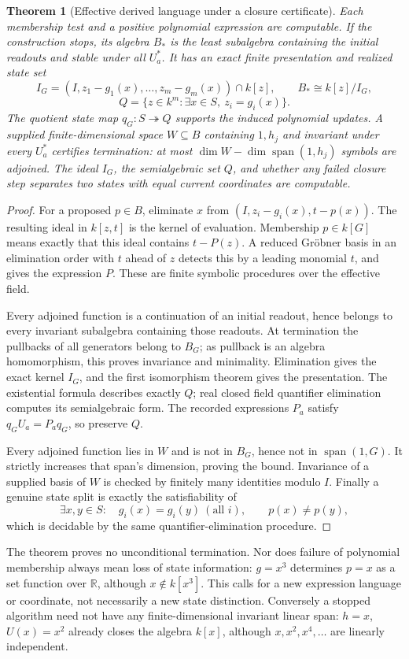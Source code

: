 \documentclass[11pt]{article}
\newtheorem{theorem}{Theorem}[section]
\theoremstyle{definition}
\theoremstyle{remark}\newtheorem{remark}[theorem]{Remark}
\newcommand{\R}{\mathbb R}
\begin{document}
\begin{theorem}[Effective derived language under a closure certificate]
\label{thm:polynomial}
Each membership test and a positive polynomial expression are computable.
If the construction stops, its algebra $B_*$ is the least subalgebra
containing the initial readouts and stable under all $U_a^*$. It has an
exact finite presentation and realized state set
\[
 I_G=(I,z_1-g_1(x),\ldots,z_m-g_m(x))\cap k[z],\qquad
 B_*\cong k[z]/I_G,
\]
\[
 Q=\{z\in k^m:\exists x\in S,\ z_i=g_i(x)\}.
\]
The quotient state map $q_G:S\twoheadrightarrow Q$ supports the induced
polynomial updates. A supplied finite-dimensional space $W\subseteq B$
containing $1,h_j$ and invariant under every $U_a^*$ certifies termination:
at most $\dim W-\dim\operatorname{span}(1,h_j)$ symbols are adjoined.
The ideal $I_G$, the semialgebraic set $Q$, and whether any failed closure
step separates two states with equal current coordinates are computable.
\end{theorem}
\begin{proof}
For a proposed $p\in B$, eliminate $x$ from
$(I,z_i-g_i(x),t-p(x))$. The resulting ideal in $k[z,t]$ is the kernel of
evaluation. Membership $p\in k[G]$ means exactly that this ideal contains
$t-P(z)$. A reduced Gr\"obner basis in an elimination order with $t$ ahead
of $z$ detects this by a leading monomial $t$, and gives the expression
$P$. These are finite symbolic procedures over the effective field.

Every adjoined function is a continuation of an initial readout, hence
belongs to every invariant subalgebra containing those readouts. At
termination the pullbacks of all generators belong to $B_G$; as pullback
is an algebra homomorphism, this proves invariance and minimality.
Elimination gives the exact kernel $I_G$, and the first isomorphism theorem
gives the presentation. The existential formula describes exactly $Q$;
real closed field quantifier elimination computes its semialgebraic form.
The recorded expressions $P_a$ satisfy $q_GU_a=P_aq_G$, so preserve $Q$.

Every adjoined function lies in $W$ and is not in $B_G$, hence not in
$\operatorname{span}(1,G)$. It strictly increases that span's dimension,
proving the bound. Invariance of a supplied basis of $W$ is checked by
finitely many identities modulo $I$. Finally a genuine state split is
exactly the satisfiability of
\[
 \exists x,y\in S:\quad g_i(x)=g_i(y)\ (\text{all }i),\qquad p(x)\ne p(y),
\]
which is decidable by the same quantifier-elimination procedure.
\end{proof}
The theorem proves no unconditional termination. Nor does failure of
polynomial membership always mean loss of state information: $g=x^3$
determines $p=x$ as a set function over $\R$, although $x\notin k[x^3]$.
This calls for a new expression language or coordinate, not necessarily a
new state distinction. Conversely a stopped algorithm need not have any
finite-dimensional invariant linear span: $h=x$, $U(x)=x^2$ already closes
the algebra $k[x]$, although $x,x^2,x^4,\ldots$ are linearly independent.
\end{document}
